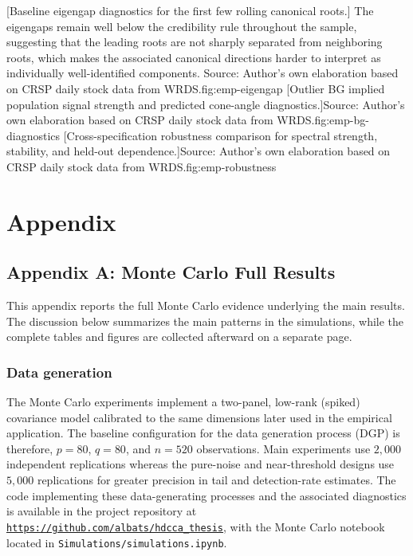 \documentclass[12pt]{report} %
\let\chapterwithpagebreak\chapter
\newcommand{\chaptersnewpage}{%
  \let\chapter\chapterwithpagebreak}
\begin{document}
[Baseline eigengap diagnostics for the first few rolling canonical roots.]{
The eigengaps remain well below the credibility rule throughout the sample, suggesting that the leading roots 
are not sharply separated from neighboring roots, which makes the associated canonical directions harder to 
interpret as individually well-identified components. Source: Author's own elaboration based on CRSP daily stock data from WRDS.}{fig:emp-eigengap}
[Outlier BG implied population signal strength and predicted cone-angle diagnostics.]{Source: Author's own elaboration based on CRSP daily stock data from WRDS.}{fig:emp-bg-diagnostics}
[Cross-specification robustness comparison for spectral strength, stability, and held-out dependence.]{Source: Author's own elaboration based on CRSP daily stock data from WRDS.}{fig:emp-robustness}

\chaptersnewpage
\clearpage
{}
\setcounter{page}{1}
{}
\chapter*{Appendix}\label{app:appendixA}
\section*{Appendix A: Monte Carlo Full Results}\label{app:mc-results}

This appendix reports the full Monte Carlo evidence underlying the main results. 
The discussion below summarizes the main patterns in the simulations, while the complete tables and figures are collected afterward on a separate page.

\subsection*{Data generation}

The Monte Carlo experiments implement a two-panel, low-rank (spiked) covariance model calibrated to the same 
dimensions later used in the empirical application. The baseline configuration for the data generation process 
(DGP) is therefore, $p=80$, $q=80$, and $n=520$ observations. Main experiments use $2{,}000$ independent 
replications whereas the pure-noise and near-threshold designs use $5{,}000$ replications for greater 
precision in tail and detection-rate estimates.
The code implementing these data-generating processes and the associated diagnostics is available in the project 
repository at \texttt{\url{https://github.com/albats/hdcca_thesis}}, with the Monte Carlo notebook located in 
\texttt{Simulations/simulations.ipynb}.
\end{document}
